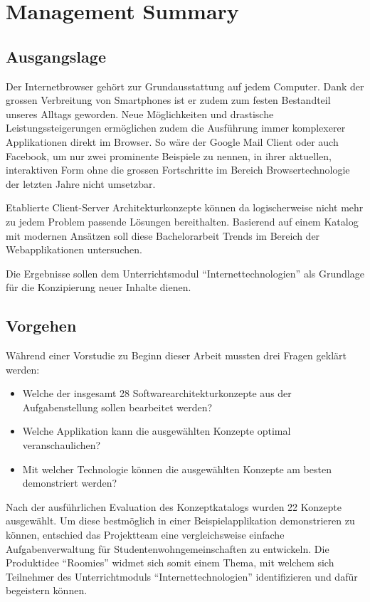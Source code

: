 \chapter{Management Summary}

\section{Ausgangslage}
Der Internetbrowser gehört zur Grundausstattung auf jedem Computer. Dank der grossen Verbreitung von Smartphones ist er zudem zum festen Bestandteil unseres Alltags geworden. Neue Möglichkeiten und drastische Leistungssteigerungen ermöglichen zudem die Ausführung immer komplexerer Applikationen direkt im Browser. So wäre der Google Mail Client oder auch Facebook, um nur zwei prominente Beispiele zu nennen, in ihrer aktuellen, interaktiven Form ohne die grossen Fortschritte im Bereich Browsertechnologie der letzten Jahre nicht umsetzbar.

Etablierte Client-Server Architekturkonzepte können da logischerweise nicht mehr zu jedem Problem passende Lösungen bereithalten. Basierend auf einem Katalog mit modernen Ansätzen soll diese Bachelorarbeit Trends im Bereich der Webapplikationen untersuchen.

Die Ergebnisse sollen dem Unterrichtsmodul ``Internettechnologien'' als Grundlage für die Konzipierung neuer Inhalte dienen.


\section{Vorgehen}

Während einer Vorstudie zu Beginn dieser Arbeit mussten drei Fragen geklärt werden:

\begin{itemize}
	\item Welche der insgesamt 28 Softwarearchitekturkonzepte aus der Aufgabenstellung sollen bearbeitet werden?
	\item Welche Applikation kann die ausgewählten Konzepte optimal veranschaulichen?
	\item Mit welcher Technologie können die ausgewählten Konzepte am besten demonstriert werden?
\end{itemize}

Nach der ausführlichen Evaluation des Konzeptkatalogs wurden 22 Konzepte ausgewählt. Um diese bestmöglich in einer Beispielapplikation demonstrieren zu können, entschied das Projektteam eine vergleichsweise einfache Aufgabenverwaltung für Studentenwohngemeinschaften zu entwickeln. Die Produktidee ``Roomies'' widmet sich somit einem Thema, mit welchem sich Teilnehmer des Unterrichtmoduls ``Internettechnologien'' identifizieren und dafür begeistern können.

